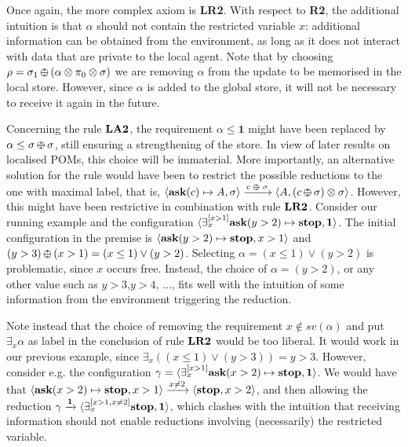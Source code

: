 \documentclass{llncs}
\def\1{{\mathbf 1}}
\newcommand{\ask}{{\bf ask}}
\newcommand{\ostop}{{\bf stop}}
\def\monid{{\mathbf 0}}
\def\1{{\mathbf 1}}
\def\odiv{\, {\ominus\hspace{-7.7pt} \div} \,}
\def\monid{\mathbf{1}}
\begin{document}
Once again, the more complex axiom is {\bf LR2}. With respect to {\bf R2}, the additional intuition is that 
$\alpha$ should not contain the restricted variable $x$: additional information can be obtained from the environment,
as long as it does not interact with data that are private to the local agent.
%
Note that by choosing $\rho = \sigma_1 \odiv (\alpha \otimes \pi_0  \otimes \sigma)$ we are 
removing $\alpha$ from the update to be memorised in the local store. However, 
since $\alpha$ is added to the global store, it will not be necessary to receive it again in the future. 


\def\ooodiv{\; {\ominus\hspace{-5.7pt} \div} \;}

\begin{remark}
Concerning the rule ${\bf LA2}$, the requirement $\alpha \leq \1$ might have been replaced by $\alpha \leq \sigma \odiv \sigma$,
still ensuring a strengthening of the store. In view of later results on localised POMs, this choice will be immaterial.
%
More importantly, an alternative solution for the rule would have been to restrict the possible reductions to the one with maximal label, 
that is, $\langle \hbox{\ask}(c) \mapsto A, \sigma \rangle \xrightarrow{c \ooodiv \sigma} \langle A, (c \odiv \sigma) \otimes \sigma \rangle$. 
However, this might have been restrictive in combination with rule ${\bf LR2}$.
Consider  our running example and the configuration 
$\langle \exists^{[x > 1]}_x \hbox{\ask}(y > 2) \mapsto \hbox{\ostop}, \monid \rangle$. The initial configuration in the premise is
$\langle \hbox{\ask}(y > 2) \mapsto \hbox{\ostop}, x > 1 \rangle$ and $(y > 3) \odiv (x > 1) = (x \leq 1) \vee (y > 2)$.
Selecting $\alpha = (x \leq 1) \vee (y > 2)$ is problematic, since $x$ occurs free. Instead, the choice of $\alpha = (y > 2)$,
or any other value such as $y > 3$,$ y > 4$, $\ldots$, fits well with the intuition of some information  from the environment 
triggering the reduction.

Note instead that the choice of removing the requirement $x \not \in sv(\alpha)$ and put $\exists_x \alpha$ as label in the 
conclusion of rule ${\bf LR2}$ would  be too liberal. It would work in our previous example, since 
$\exists_x((x \leq 1) \vee (y > 3)) = y > 3$. However, consider e.g. 
the configuration $\gamma = \langle \exists^{[x > 1]}_x \hbox{\ask}(x > 2) \mapsto \hbox{\ostop}, \monid \rangle$. 
We would have that 
$\langle \hbox{\ask}(x > 2) \mapsto \hbox{\ostop}, x > 1 \rangle \xrightarrow{x \neq 2} \langle \hbox{\ostop}, x > 2 \rangle$,
and then allowing the reduction $\gamma \xrightarrow{\monid} \langle \exists^{[x > 1, x \neq 2]}_x \hbox{\ostop}, \monid \rangle$,
which clashes with the intuition that receiving information should not enable reductions involving (necessarily) 
the restricted variable.
\end{remark}
\end{document}
